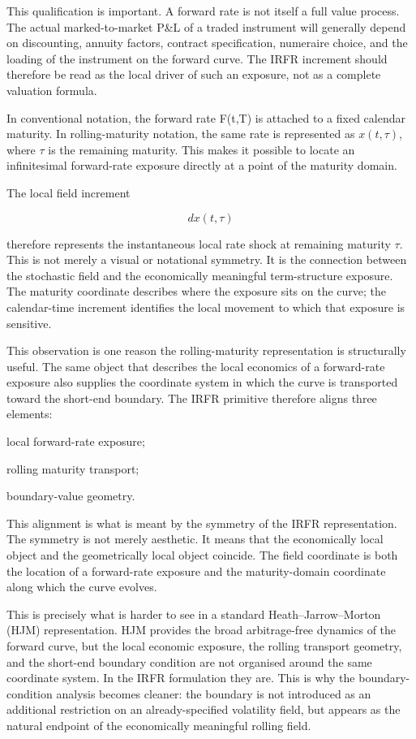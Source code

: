 \documentclass[11pt,oneside]{book}
\begin{document}
This qualification is important. A forward rate is not itself a full
value process. The actual marked-to-market P\&L of a traded instrument
will generally depend on discounting, annuity factors, contract
specification, numeraire choice, and the loading of the instrument on
the forward curve. The IRFR increment should therefore be read as the
local driver of such an exposure, not as a complete valuation formula.

In conventional notation, the forward rate F(t,T) is attached to a fixed
calendar maturity. In rolling-maturity notation, the same rate is
represented as $x(t,\tau)$, where $\tau$ is the remaining maturity. This makes it
possible to locate an infinitesimal forward-rate exposure directly at a
point of the maturity domain.

The local field increment

\[
dx(t,\tau)
\]

therefore represents the instantaneous local rate shock at remaining
maturity $\tau$. This is not merely a visual or notational symmetry. It is
the connection between the stochastic field and the economically
meaningful term-structure exposure. The maturity coordinate describes
where the exposure sits on the curve; the calendar-time increment
identifies the local movement to which that exposure is sensitive.

This observation is one reason the rolling-maturity representation is
structurally useful. The same object that describes the local economics
of a forward-rate exposure also supplies the coordinate system in which
the curve is transported toward the short-end boundary. The IRFR
primitive therefore aligns three elements:

local forward-rate exposure;

rolling maturity transport;

boundary-value geometry.

This alignment is what is meant by the symmetry of the IRFR
representation. The symmetry is not merely aesthetic. It means that the
economically local object and the geometrically local object coincide.
The field coordinate is both the location of a forward-rate exposure and
the maturity-domain coordinate along which the curve evolves.

This is precisely what is harder to see in a standard
Heath--Jarrow--Morton (HJM) representation. HJM provides the broad
arbitrage-free dynamics of the forward curve, but the local economic
exposure, the rolling transport geometry, and the short-end boundary
condition are not organised around the same coordinate system. In the
IRFR formulation they are. This is why the boundary-condition analysis
becomes cleaner: the boundary is not introduced as an additional
restriction on an already-specified volatility field, but appears as the
natural endpoint of the economically meaningful rolling field.
\end{document}
